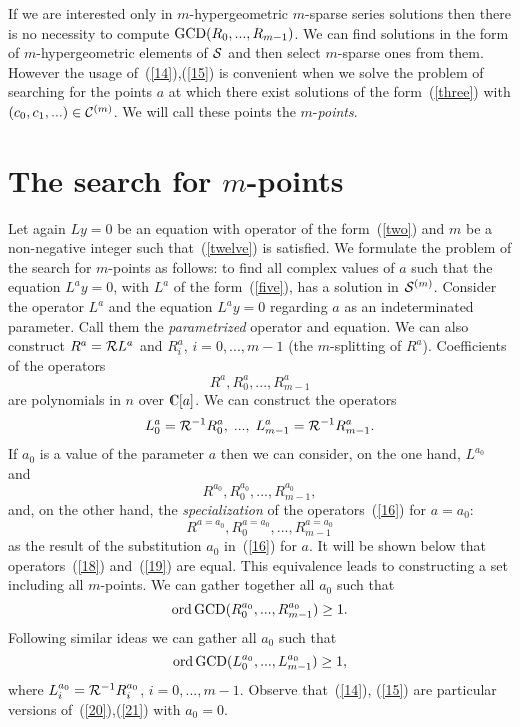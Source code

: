 If we are interested only in $m$-hypergeometric $m$-sparse
series solutions then there is no necessity to compute
$\mathop{\rm GCD}(R_0,...,R_{m-1})$. We can find solutions in the form of
$m$-hypergeometric elements of ${\cal S}$ and then select $m$-sparse
ones from them.
However the usage of~(\ref{14}),(\ref{15}) is convenient when we solve
the problem of searching for the points $a$ at which there exist solutions of
the form~(\ref{three}) with $(c_0,c_1,...)\in {\cal C}^{(m)}$. We will call
these points the $m$-{\em points}.

\section{The search for $m$-points}
Let again $Ly=0$ be an equation with operator of the form~(\ref{two})
and $m$ be a non-negative
integer such that~(\ref{twelve}) is satisfied. We formulate the problem of
the search
for $m$-points as follows: to find all complex values of $a$ such that
the equation
$L^ay=0$, with $L^a$ of the form~(\ref{five}), has a solution in
${\cal S}^{(m)}$.
Consider the operator $L^a$ and the equation $L^ay=0$ regarding $a$ as an
indeterminated parameter. Call them the {\em parametrized}
operator and equation.
We can also construct $R^a={\cal R}L^a$ and $R_i^a$, $i=0,...,m-1$
(the $m$-splitting
of $R^a$). Coefficients of the operators
\begin{equation}
\label{16}
R^a,R_0^a,...,R_{m-1}^a
\end{equation}
are polynomials in $n$ over $\complex[a]$. We can construct the operators
\begin{equation}
\label{17}
L_0^a={\cal R}^{-1}R_0^a,\;...,\;L_{m-1}^a={\cal R}^{-1}R_{m-1}^a.
\end{equation}
If $a_0$ is a value of the parameter $a$ then we can consider, on the one hand,
$L^{a_0}$ and
\begin{equation}
\label{18}
R^{a_0},R_0^{a_0},...,R_{m-1}^{a_0},
\end{equation}
and, on the other hand, the {\em specialization} of the operators~(\ref{16})
for $a=a_0$:
\begin{equation}
\label{19}
R^{a=a_0},R_0^{a=a_0},...,R_{m-1}^{a=a_0}
\end{equation}
as the result of the substitution $a_0$ in~(\ref{16}) for $a$. It will
be shown below that operators~(\ref{18}) and~(\ref{19}) are equal.
This equivalence leads to constructing a set including all $m$-points.
We can gather together all $a_0$ such that
\begin{equation}
\label{20}
\mathop{\rm ord} \mathop{\rm GCD}(R_0^{a_0},...,R_{m-1}^{a_0}) \ge 1.
\end{equation}
Following similar ideas we can gather all $a_0$ such that
\begin{equation}
\label{21}
\mathop{\rm ord} \mathop{\rm GCD}(L_0^{a_0},...,L_{m-1}^{a_0}) \ge 1,
\end{equation}
where $L_i^{a_0}={\cal R}^{-1}R_i^{a_0}$, $i=0,...,m-1$. Observe
that~(\ref{14}),
(\ref{15}) are particular versions of~(\ref{20}),(\ref{21}) with $a_0=0$.

